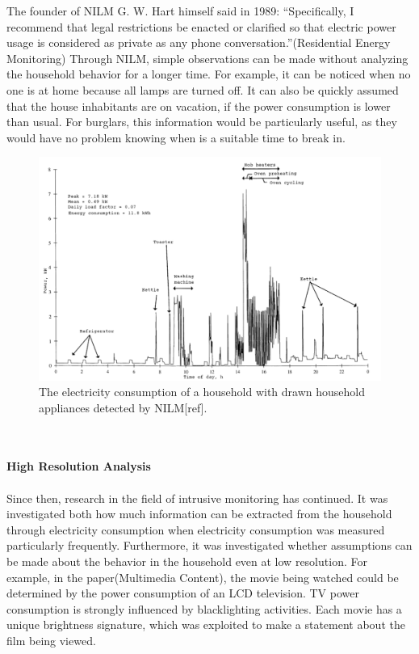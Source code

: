 The founder of NILM G. W. Hart himself said in 1989: ``Specifically, I recommend that legal restrictions be enacted or clarified so that electric power usage is considered as private as any phone conversation.''(Residential Energy Monitoring)
Through NILM, simple observations can be made without analyzing the household behavior for a longer time. For example, it can be noticed when no one is at home because all lamps are turned off. It can also be quickly assumed that the house inhabitants are on vacation, if the power consumption is lower than usual. For burglars, this information would be particularly useful, as they would have no problem knowing when is a suitable time to break in.
\begin{figure}[tbp]
  \centering
  \includegraphics[width=1\textwidth]{images/nilm.png}
  \caption[Detected NILM Appliances]{The electricity consumption of a household with drawn household appliances detected by NILM[ref].}
  \label{fig:Nilm}
\end{figure}
\\
\\
\textbf{High Resolution Analysis}
\\
\\
Since then, research in the field of intrusive monitoring has continued. It was investigated both how much information can be extracted from the household through electricity consumption when electricity consumption was measured particularly frequently. Furthermore, it was investigated whether assumptions can be made about the behavior in the household even at low resolution.
For example, in the paper(Multimedia Content), the movie being watched could be determined by the power consumption of an LCD television. TV power consumption is strongly influenced by blacklighting activities. Each movie has a unique brightness signature, which was exploited to make a statement about the film being viewed.\\
